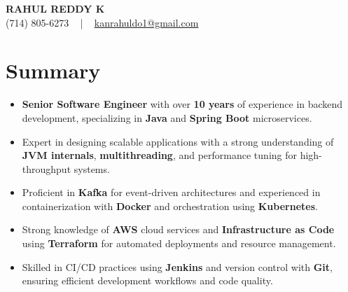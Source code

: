 \documentclass[letterpaper,11pt]{article}
\newcommand{\resumeItem}[1]{
  \item\footnotesize{
    {#1 \vspace{-2pt}}
  }
}
\newcommand{\resumeItemListStart}{\begin{itemize}[leftmargin=*]}
\newcommand{\resumeItemListEnd}{\end{itemize}\vspace{-5pt}}
\begin{document}
\begin{center}
    {\fontsize{14pt}{12pt}\selectfont \textbf{\MakeUppercase{Rahul Reddy K}}}\\ \vspace{2pt}
    \fontsize{10pt}{12pt}\selectfont (714) 805-6273 ~ | ~ \href{mailto:kanrahuldo1@gmail.com}{kanrahuldo1@gmail.com}~
    \vspace{-8pt}
\end{center}

\section{Summary}
\fontsize{9pt}{10pt}\selectfont
\resumeItemListStart
    \resumeItem{\textbf{Senior Software Engineer} with over \textbf{10 years} of experience in backend development, specializing in \textbf{Java} and \textbf{Spring Boot} microservices.} \vspace{-3pt}
    \resumeItem{Expert in designing scalable applications with a strong understanding of \textbf{JVM internals}, \textbf{multithreading}, and performance tuning for high-throughput systems.} \vspace{-3pt}
    \resumeItem{Proficient in \textbf{Kafka} for event-driven architectures and experienced in containerization with \textbf{Docker} and orchestration using \textbf{Kubernetes}.} \vspace{-3pt}
    \resumeItem{Strong knowledge of \textbf{AWS} cloud services and \textbf{Infrastructure as Code} using \textbf{Terraform} for automated deployments and resource management.} \vspace{-3pt}
    \resumeItem{Skilled in CI/CD practices using \textbf{Jenkins} and version control with \textbf{Git}, ensuring efficient development workflows and code quality.} \vspace{-3pt}
\resumeItemListEnd
\vspace{-6pt}
\end{document}
